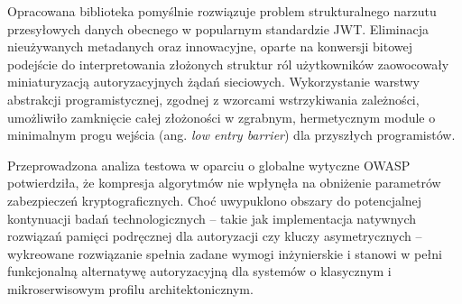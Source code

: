 \documentclass{SGGW-thesis}
\begin{document}
Opracowana biblioteka pomyślnie rozwiązuje problem strukturalnego narzutu przesyłowych danych obecnego w popularnym standardzie JWT. Eliminacja nieużywanych metadanych oraz innowacyjne, oparte na konwersji bitowej podejście do interpretowania złożonych struktur ról użytkowników zaowocowały miniaturyzacją autoryzacyjnych żądań sieciowych. Wykorzystanie warstwy abstrakcji programistycznej, zgodnej z wzorcami wstrzykiwania zależności, umożliwiło zamknięcie całej złożoności w zgrabnym, hermetycznym module o minimalnym progu wejścia (ang. \textit{low entry barrier}) dla przyszłych programistów. 

Przeprowadzona analiza testowa w oparciu o globalne wytyczne OWASP potwierdziła, że kompresja algorytmów nie wpłynęła na obniżenie parametrów zabezpieczeń kryptograficznych. Choć uwypuklono obszary do potencjalnej kontynuacji badań technologicznych – takie jak implementacja natywnych rozwiązań pamięci podręcznej dla autoryzacji czy kluczy asymetrycznych – wykreowane rozwiązanie spełnia zadane wymogi inżynierskie i stanowi w pełni funkcjonalną alternatywę autoryzacyjną dla systemów o klasycznym i mikroserwisowym profilu architektonicznym.
\end{document}
